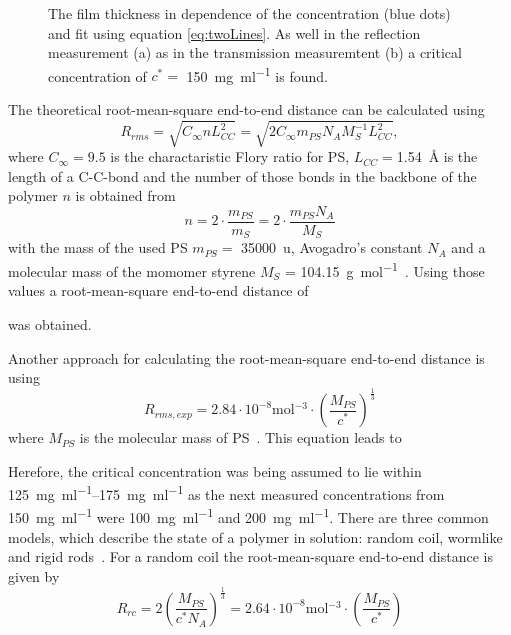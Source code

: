 \begin{figure}[ht]
    \caption{The film thickness in dependence of the concentration (blue dots) and fit using equation \ref{eq:twoLines}. As well in the reflection measurement (a) as in the transmission measuremtent (b) a critical concentration of $c^* =$ \SI{150}{\milli\gram\per\milli\litre} is found.}
    \label{fig:FitConc}
\end{figure}

The theoretical root-mean-square end-to-end distance can be calculated using 
\begin{equation}
    R_{rms} = \sqrt{C_{\infty}nL_{CC}^2} = \sqrt{2C_{\infty}m_{PS}N_AM_S^{-1}L_{CC}^2},
    \label{eq:Rrms}
\end{equation}
where $C_{\infty} = 9.5$ is the charactaristic Flory ratio for PS, $L_{CC} =$\SI{1.54}{\angstrom} is the length of a C-C-bond and the number of those bonds in the backbone of the polymer $n$ is obtained from 
\begin{equation}
    n = 2 \cdot \frac{m_{PS}}{m_S} = 2 \cdot \frac{m_{PS}N_A}{M_S}
\end{equation}
with the mass of the used PS $m_{PS} = $ \SI{35000}{\atomicmassunit}, Avogadro's constant $N_A$ and a molecular mass of the momomer styrene $M_S$ = \SI{104.15}{\gram\per\mol}~\cite{Fetters.2007,Styrol}. Using those values a root-mean-square end-to-end distance of \par
\centerline{} \par 
was obtained. \par
Another approach for calculating the root-mean-square end-to-end distance is using 
\begin{equation}
    R_{rms,exp} = 2.84 \cdot 10^{-8} \si{\mol^{-3}} \cdot (\frac{M_{PS}}{c^*})^\frac{1}{3}
    \label{eq:Daum}
\end{equation}
where $M_{PS}$ is the molecular mass of PS~\cite{Daum.1969}. This equation leads to \par 
\centerline{} \par
Herefore, the critical concentration was being assumed to lie within \SIrange{125}{175}{\milli\gram\per\milli\litre} as the next measured concentrations from \SI{150}{\milli\gram\per\milli\litre} were \SI{100}{\milli\gram\per\milli\litre} and \SI{200}{\milli\gram\per\milli\litre}. 
There are three common models, which describe the state of a polymer in solution: random coil, wormlike and rigid rods~\cite{Ying.1987}. For a random coil the root-mean-square end-to-end distance is given by \begin{equation}
    R_{rc} = 2 (\frac{M_{PS}}{c^*N_A})^\frac{1}{3} = 2.64 \cdot 10^{-8} \si{\mol^{-3}} \cdot (\frac{M_{PS}}{c^*})
    \label{eq:rcoil}
\end{equation}
